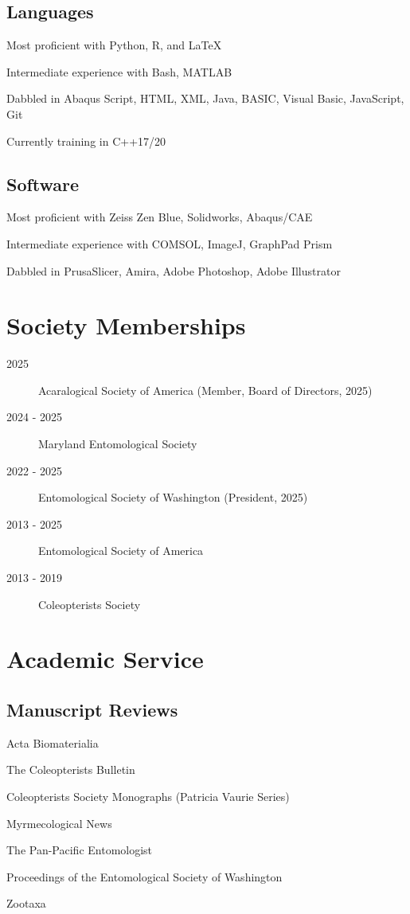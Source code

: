 \documentclass[12pt,a4paper]{article}
\begin{document}
	\subsection*{Languages}
		\begin{description}
			\item Most proficient with Python, R, and \LaTeX
			\item Intermediate experience with Bash, MATLAB
			\item Dabbled in Abaqus Script, HTML, XML, Java, BASIC, Visual Basic, JavaScript, Git
			\item Currently training in C++17/20
		\end{description}
		
	\subsection*{Software}
		\begin{description}
			\item Most proficient with Zeiss Zen Blue, Solidworks, Abaqus/CAE
			\item Intermediate experience with COMSOL, ImageJ, GraphPad Prism
			\item Dabbled in PrusaSlicer, Amira, Adobe Photoshop, Adobe Illustrator
		\end{description}


\section*{Society Memberships}
	\begin{description}
		\item [2025] Acaralogical Society of America (Member, Board of Directors, 2025)
		\item [2024 - 2025] Maryland Entomological Society
		\item [2022 - 2025]	Entomological Society of Washington (President, 2025)
		\item [2013 - 2025] Entomological Society of America
		\item [2013 - 2019] Coleopterists Society
	\end{description}

\section*{Academic Service}
	\subsection*{Manuscript Reviews}
		\begin{description}
			\item Acta Biomaterialia
			\item The Coleopterists Bulletin
			\item Coleopterists Society Monographs (Patricia Vaurie Series)
			\item Myrmecological News
			\item The Pan-Pacific Entomologist
			\item Proceedings of the Entomological Society of Washington
			\item Zootaxa
		\end{description}
\end{document}
